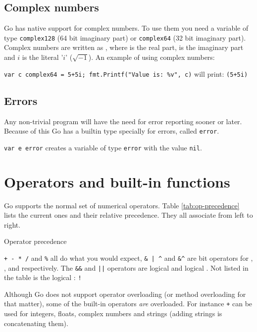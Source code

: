 \subsection{Complex numbers}
Go has native support for complex numbers. To
use them you need a variable of type \lstinline{complex128} (64
bit imaginary part) or \lstinline{complex64} (32 bit
imaginary part).
Complex numbers are written as
, where  is the real part,
 is the imaginary part and $i$ is the literal '$i$' ($\sqrt{-1}$).
An example of using complex numbers:

\lstinline{var c complex64 = 5+5i; fmt.Printf("Value is: %v", c)}\newline
will print: \lstinline{(5+5i)}

\subsection{Errors}
Any non-trivial program will have the need for error reporting sooner or later. Because of this
Go has a builtin type specially for errors, called \lstinline{error}.

\lstinline{var e error} creates a variable  of type \lstinline{error} with the value \lstinline{nil}.

\section{Operators and built-in functions}
\label{sec:builtins}
Go supports the normal set of numerical operators.
Table \ref{tab:op-precedence}
lists the current ones and their relative precedence. They
all associate from left to right.

\begin{table}[H]
\begin{center}
\caption{Operator precedence}
\label{tab:op-precedence}

\end{center}
\end{table}
\verb|+ - * /| and \verb|%| all do what you would expect,
\verb!& | ^!
and \verb!&^! are bit operators for
, 
,  and  respectively.
The \verb|&&| and \verb/||/ operators are 
logical  and
logical . Not listed in the table
is the logical : \verb/!/

Although Go does not support operator overloading (or method
overloading for that matter), some of the built-in
operators \emph{are} overloaded. For instance \texttt{+} can be used for integers,
floats, complex numbers and strings (adding strings is concatenating
them). 

